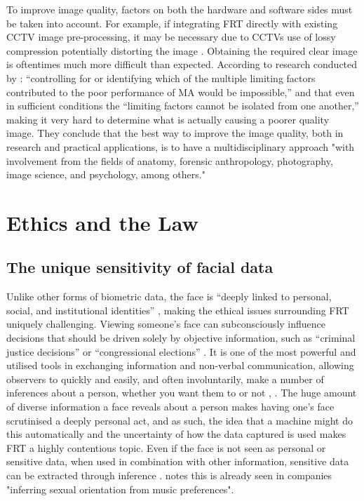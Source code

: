 \documentclass{article}
\begin{document}
To improve image quality, factors on both the hardware and software sides must be taken into account. For example, if integrating FRT directly with existing CCTV image pre-processing, it may be necessary due to CCTVs use of lossy compression potentially distorting the image \cite{PPFOfFRT}. Obtaining the required clear image is oftentimes much more difficult than expected. According to research conducted by \cite{Bacci2021}: “controlling for or identifying which of the multiple limiting factors contributed to the poor performance of MA would be impossible,” and that even in sufficient conditions the “limiting factors cannot be isolated from one another,” making it very hard to determine what is actually causing a poorer quality image. They conclude that the best way to improve the image quality, both in research and practical applications, is to have a multidisciplinary approach "with involvement from the fields of anatomy, forensic anthropology, photography, image science, and psychology, among others." 

\section{Ethics and the Law}
\subsection{The unique sensitivity of facial data}
Unlike other forms of biometric data, the face is “deeply linked to personal, social, and institutional identities” \cite{EthicsOfFRTOxford}, making the ethical issues surrounding FRT uniquely challenging. Viewing someone's face can subconsciously influence decisions that should be driven solely by objective information, such as “criminal justice decisions” or “congressional elections” \cite{Zebrowitz2008}. It is one of the most powerful and utilised tools in exchanging information and non-verbal communication, allowing observers to quickly and easily, and often involuntarily, make a number of inferences about a person, whether you want them to or not \cite{JACK2015R621}, \cite{Hall2019}. The huge amount of diverse information a face reveals about a person makes having one's face scrutinised a deeply personal act, and as such, the idea that a machine might do this automatically and the uncertainty of how the data captured is used makes FRT a highly contentious topic. Even if the face is not seen as personal or sensitive data, when used in combination with other information, sensitive data can be extracted through inference \cite{SurveillanceDelusionOxford}. \cite{SurveillanceDelusionOxford} notes this is already seen in companies "inferring sexual orientation from music preferences".
\end{document}
